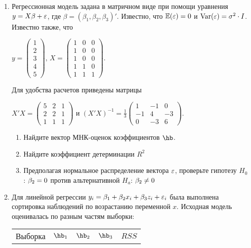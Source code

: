 \documentclass[12pt, a4paper]{article}
\theoremstyle{definition}
\begin{document}
\begin{enumerate}
\item Регрессионная модель  задана в матричном виде при помощи уравнения $y=X\beta+\varepsilon$, где $\beta=(\beta_1,\beta_2,\beta_3)'$.
Известно, что $\mathbb{E}(\varepsilon)=0$  и  $\operatorname{Var}(\varepsilon)=\sigma^2\cdot I$.
Известно также, что

$y=\left(
\begin{array}{c}
1\\
2\\
3\\
4\\
5
\end{array}\right)$,
$X=\left(\begin{array}{ccc}
1 & 0 & 0 \\
1 & 0 & 0 \\
1 & 0 & 0 \\
1 & 1 & 0 \\
1 & 1 & 1
\end{array}\right)$.


Для удобства расчетов приведены матрицы


$X'X=\left(
\begin{array}{ccc}
5 & 2 & 1\\
2 & 2 & 1\\
1 & 1 & 1
\end{array}\right)$ и $(X'X)^{-1}=\frac{1}{3}\left(
\begin{array}{ccc}
1 & -1 & 0 \\
-1 & 4 & -3 \\
0 & -3 & 6
\end{array}\right)$.

\begin{enumerate}
\item Найдите вектор МНК-оценок коэффициентов $\hb$.
\item Найдите коэффициент детерминации $R^2$
\item Предполагая нормальное распределение вектора $\varepsilon$, проверьте гипотезу $H_0$: $\beta_2=0$ против альтернативной $H_a$: $\beta_2\neq 0$
\end{enumerate}

\item Для линейной регрессии $y_i = \beta_1 + \beta_2 x_i + \beta_3 z_i + \varepsilon_i$ была выполнена сортировка наблюдений по возрастанию переменной $x$. Исходная модель оценивалась по разным частям выборки:

\begin{tabular}{c|cccc}
Выборка & $\hb_1$ & $\hb_2$ & $\hb_3$ & $RSS$ \\


\end{tabular}
\end{enumerate}
\end{document}
